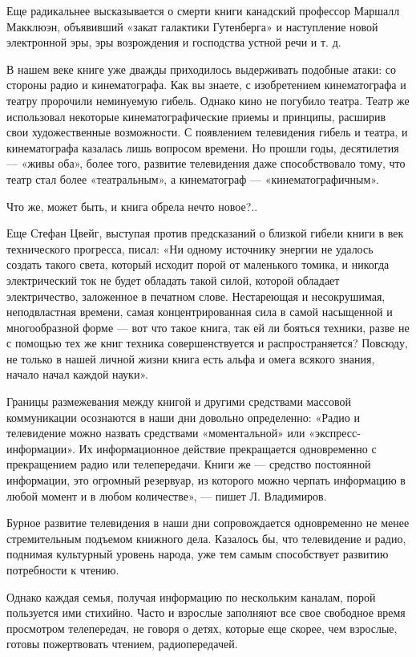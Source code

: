 \documentclass[12pt, a4paper, openany]{book}
\begin{document}
Еще радикальнее высказывается о смерти книги канадский профессор Маршалл Макклюэн, объявивший «закат галактики Гутенберга» и наступление новой электронной эры, эры возрождения и господства устной речи и т. д. 

В нашем веке книге уже дважды приходилось выдерживать подобные атаки: со стороны радио и кинематографа. Как вы знаете, с изобретением кинематографа и театру пророчили неминуемую гибель. Однако кино не погубило театра. Театр же использовал некоторые кинематографические приемы и принципы, расширив свои художественные возможности. С появлением телевидения гибель и театра, и кинематографа казалась лишь вопросом времени. Но прошли годы, десятилетия — «живы оба», более того, развитие телевидения даже способствовало тому, что театр стал более «театральным», а кинематограф — «кинематографичным». 

Что же, может быть, и книга обрела нечто новое?.. 

Еще Стефан Цвейг, выступая против предсказаний о близкой гибели книги в век технического прогресса, писал: «Ни одному источнику энергии не удалось создать такого света, который исходит порой от маленького томика, и никогда электрический ток не будет обладать такой силой, которой обладает электричество, заложенное в печатном слове. Нестареющая и несокрушимая, неподвластная времени, самая концентрированная сила в самой насыщенной и многообразной форме — вот что такое книга, так ей ли бояться техники, разве не с помощью тех же книг техника совершенствуется и распространяется? Повсюду, не только в нашей личной жизни книга есть альфа и омега всякого знания, начало начал каждой науки». 

Границы размежевания между книгой и другими средствами массовой коммуникации осознаются в наши дни довольно определенно: «Радио и телевидение можно назвать средствами «моментальной» или «экспресс-информации». Их информационное действие прекращается одновременно с прекращением радио или телепередачи. Книги же — средство постоянной информации, это огромный резервуар, из которого можно черпать информацию в любой момент и в любом количестве», — пишет Л. Владимиров. 

Бурное развитие телевидения в наши дни сопровождается одновременно не менее стремительным подъемом книжного дела. Казалось бы, что телевидение и радио, поднимая культурный уровень народа, уже тем самым способствует развитию потребности к чтению. 

Однако каждая семья, получая информацию по нескольким каналам, порой пользуется ими стихийно. Часто и взрослые заполняют все свое свободное время просмотром телепередач, не говоря о детях, которые еще скорее, чем взрослые, готовы пожертвовать чтением, радиопередачей. 
\end{document}
